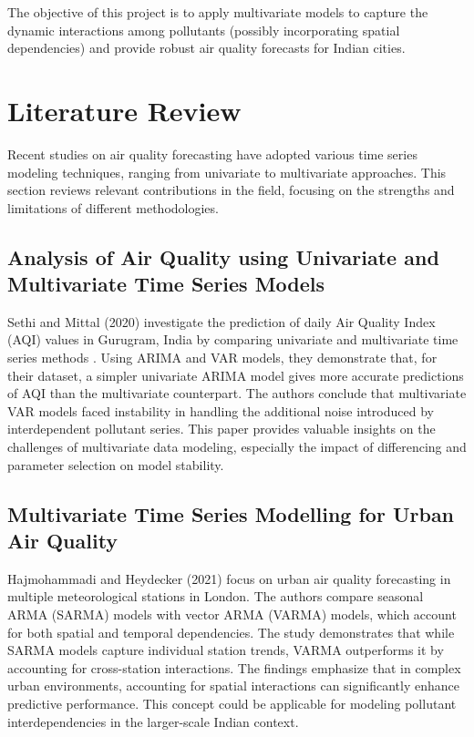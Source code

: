 \documentclass[fleqn,10pt]{SelfArx} %
\begin{document}
The objective of this project is to apply multivariate models to capture the dynamic interactions among pollutants (possibly incorporating spatial dependencies) and provide robust air quality forecasts for Indian cities.


\section{Literature Review}
Recent studies on air quality forecasting have adopted various time series modeling techniques, ranging from univariate to multivariate approaches. This section reviews relevant contributions in the field, focusing on the strengths and limitations of different methodologies.

\subsection*{Analysis of Air Quality using Univariate and Multivariate Time Series Models}
Sethi and Mittal (2020) investigate the prediction of daily Air Quality Index (AQI) values in Gurugram, India by comparing univariate and multivariate time series methods \cite{sethi2020}. Using ARIMA and VAR models, they demonstrate that, for their dataset, a simpler univariate ARIMA model gives more accurate predictions of AQI than the multivariate counterpart. The authors conclude that multivariate VAR models faced instability in handling the additional noise introduced by interdependent pollutant series. This paper provides valuable insights on the challenges of multivariate data modeling, especially the impact of differencing and parameter selection on model stability.

\subsection*{Multivariate Time Series Modelling for Urban Air Quality}
Hajmohammadi and Heydecker (2021) focus on urban air quality forecasting in multiple meteorological stations in London. The authors compare seasonal ARMA (SARMA) models with vector ARMA (VARMA) models, which account for both spatial and temporal dependencies. The study demonstrates that while SARMA models capture individual station trends, VARMA outperforms it by accounting for cross-station interactions. The findings emphasize that in complex urban environments, accounting for spatial interactions can significantly enhance predictive performance. This concept could be applicable for modeling pollutant interdependencies in the larger-scale Indian context.
\end{document}
